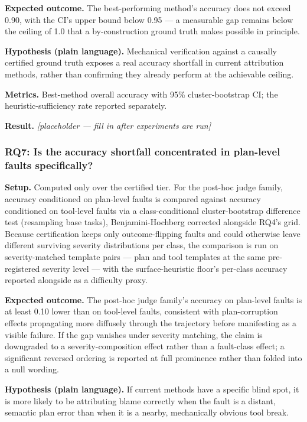 \documentclass[11pt]{article}
\newcommand{\ph}{\textit{[placeholder --- fill in after experiments are run]}}
\begin{document}
\textbf{Expected outcome.} The best-performing method's accuracy does not exceed 0.90, with the CI's upper bound below 0.95 --- a measurable gap remains below the ceiling of 1.0 that a by-construction ground truth makes possible in principle.

\textbf{Hypothesis (plain language).} Mechanical verification against a causally certified ground truth exposes a real accuracy shortfall in current attribution methods, rather than confirming they already perform at the achievable ceiling.

\textbf{Metrics.} Best-method overall accuracy with 95\% cluster-bootstrap CI; the heuristic-sufficiency rate reported separately.

\textbf{Result.} \ph

\subsubsection{RQ7: Is the accuracy shortfall concentrated in plan-level faults specifically?}
\textbf{Setup.} Computed only over the certified tier. For the post-hoc judge family, accuracy conditioned on plan-level faults is compared against accuracy conditioned on tool-level faults via a class-conditional cluster-bootstrap difference test (resampling base tasks), Benjamini-Hochberg corrected alongside RQ4's grid. Because certification keeps only outcome-flipping faults and could otherwise leave different surviving severity distributions per class, the comparison is run on severity-matched template pairs --- plan and tool templates at the same pre-registered severity level --- with the surface-heuristic floor's per-class accuracy reported alongside as a difficulty proxy.

\textbf{Expected outcome.} The post-hoc judge family's accuracy on plan-level faults is at least 0.10 lower than on tool-level faults, consistent with plan-corruption effects propagating more diffusely through the trajectory before manifesting as a visible failure. If the gap vanishes under severity matching, the claim is downgraded to a severity-composition effect rather than a fault-class effect; a significant reversed ordering is reported at full prominence rather than folded into a null wording.

\textbf{Hypothesis (plain language).} If current methods have a specific blind spot, it is more likely to be attributing blame correctly when the fault is a distant, semantic plan error than when it is a nearby, mechanically obvious tool break.
\end{document}
